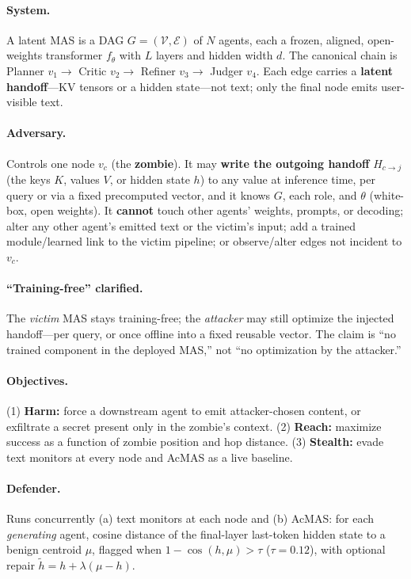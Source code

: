 \documentclass{article}
\begin{document}
\paragraph{System.} A latent MAS is a DAG $G=(\mathcal V,\mathcal E)$ of $N$ agents, each a frozen, aligned, open-weights transformer $f_\theta$ with $L$ layers and hidden width $d$. The canonical chain is Planner $v_1\!\to$ Critic $v_2\!\to$ Refiner $v_3\!\to$ Judger $v_4$. Each edge carries a \textbf{latent handoff}---KV tensors or a hidden state---not text; only the final node emits user-visible text.

\paragraph{Adversary.} Controls one node $v_c$ (the \textbf{zombie}). It may \textbf{write the outgoing handoff} $H_{c\to j}$ (the keys $K$, values $V$, or hidden state $h$) to any value at inference time, per query or via a fixed precomputed vector, and it knows $G$, each role, and $\theta$ (white-box, open weights). It \textbf{cannot} touch other agents' weights, prompts, or decoding; alter any other agent's emitted text or the victim's input; add a trained module/learned link to the victim pipeline; or observe/alter edges not incident to $v_c$.

\paragraph{``Training-free'' clarified.} The \emph{victim} MAS stays training-free; the \emph{attacker} may still optimize the injected handoff---per query, or once offline into a fixed reusable vector. The claim is ``no trained component in the deployed MAS,'' not ``no optimization by the attacker.''

\paragraph{Objectives.} (1) \textbf{Harm:} force a downstream agent to emit attacker-chosen content, or exfiltrate a secret present only in the zombie's context. (2) \textbf{Reach:} maximize success as a function of zombie position and hop distance. (3) \textbf{Stealth:} evade text monitors at every node and AcMAS as a live baseline.

\paragraph{Defender.} Runs concurrently (a) text monitors at each node and (b) AcMAS: for each \emph{generating} agent, cosine distance of the final-layer last-token hidden state to a benign centroid $\mu$, flagged when $1-\cos(h,\mu)>\tau$ ($\tau=0.12$), with optional repair $\tilde h=h+\lambda(\mu-h)$.
\end{document}
